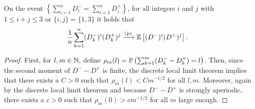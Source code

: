\begin{lemma}\label{lem:wlln_conditioned}
On the event $\left\{\sum_{i=1}^n D_i^-=\sum_{i=1}^n D_i^+ \right\}$,  for all integers $i$ and $j$ with $1\leq i+j \leq 3$ or $\{i,j\}=\{1,3\}$ it holds that 
$$\frac{1}{n}\sum_{k=1}^n (D_k^-)^i(D_k^+)^j \toprob \E\left[ (D^-)^i(D^+)^j \right].$$
\end{lemma}
\begin{proof}
First, for $l,m \in \N$, define $\rho_m(l)=\P\left(\sum_{k=1}^m (D_k^--D_k^+)=l \right)$. Then, since the second moment of $D^--D^+$ is finite, the discrete local limit theorem implies that there exists a $C>0$ such that $\rho_m(l)<Cm^{-1/2}$ for all $l,m$. Moreover, again by the discrete local limit theorem and because $D^- - D^+$ is strongly aperiodic, there exists a $c>0$ such that $\rho_m(0)>cm^{-1/2}$ for all $m$ large enough.


\end{proof}
